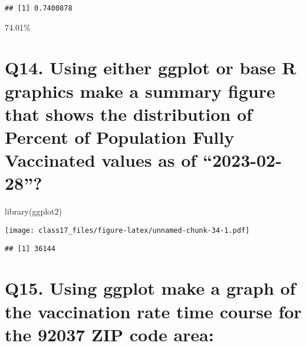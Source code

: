 \documentclass[
]{article}
\newenvironment{Shaded}{\begin{snugshade}}{\end{snugshade}}
\newcommand{\DecValTok}[1]{\textcolor[rgb]{0.00,0.00,0.81}{#1}}
\newcommand{\FunctionTok}[1]{\textcolor[rgb]{0.00,0.00,0.00}{#1}}
\newcommand{\NormalTok}[1]{#1}
\newcommand{\OtherTok}[1]{\textcolor[rgb]{0.56,0.35,0.01}{#1}}
\newcommand{\SpecialCharTok}[1]{\textcolor[rgb]{0.00,0.00,0.00}{#1}}
\newcommand{\StringTok}[1]{\textcolor[rgb]{0.31,0.60,0.02}{#1}}
\begin{document}
\begin{verbatim}
## [1] 0.7400878
\end{verbatim}

74.01\%

\hypertarget{q14.-using-either-ggplot-or-base-r-graphics-make-a-summary-figure-that-shows-the-distribution-of-percent-of-population-fully-vaccinated-values-as-of-2023-02-28}{%
\section{Q14. Using either ggplot or base R graphics make a summary
figure that shows the distribution of Percent of Population Fully
Vaccinated values as of
``2023-02-28''?}\label{q14.-using-either-ggplot-or-base-r-graphics-make-a-summary-figure-that-shows-the-distribution-of-percent-of-population-fully-vaccinated-values-as-of-2023-02-28}}

\begin{Shaded}
\begin{Highlighting}[]
\FunctionTok{library}\NormalTok{(ggplot2)}
\end{Highlighting}
\end{Shaded}

\begin{Shaded}
\end{Shaded}

\texttt{[image: class17\_files/figure-latex/unnamed-chunk-34-1.pdf]}

\begin{Shaded}
\end{Shaded}

\begin{verbatim}
## [1] 36144
\end{verbatim}

\hypertarget{q15.-using-ggplot-make-a-graph-of-the-vaccination-rate-time-course-for-the-92037-zip-code-area}{%
\section{Q15. Using ggplot make a graph of the vaccination rate time
course for the 92037 ZIP code
area:}\label{q15.-using-ggplot-make-a-graph-of-the-vaccination-rate-time-course-for-the-92037-zip-code-area}}
\end{document}
